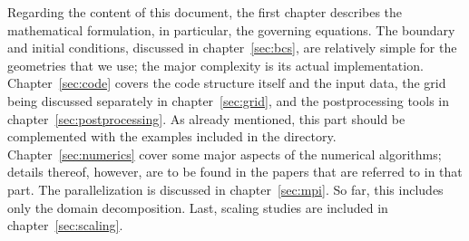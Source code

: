Regarding the content of this document, the first chapter describes the mathematical formulation, in particular, the governing equations. The boundary and initial conditions, discussed in chapter~\ref{sec:bcs}, are relatively simple for the geometries that we use; the major complexity is its actual implementation. Chapter~\ref{sec:code} covers the code structure itself and the input data, the grid being discussed separately in chapter~\ref{sec:grid}, and the postprocessing tools in chapter~\ref{sec:postprocessing}. As already mentioned, this part should be complemented with the examples included in the directory. Chapter~\ref{sec:numerics} cover some major aspects of the numerical algorithms; details thereof, however, are to be found in the papers that are referred to in that part. The parallelization is discussed in chapter~\ref{sec:mpi}. So far, this includes only the domain decomposition. Last, scaling studies are included in chapter~\ref{sec:scaling}.
